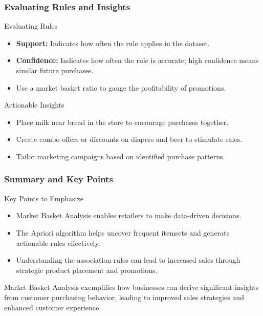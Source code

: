 \documentclass{beamer}
\begin{document}
\begin{frame}[fragile]
    \frametitle{Evaluating Rules and Insights}
    \begin{block}{Evaluating Rules}
        \begin{itemize}
            \item \textbf{Support:} Indicates how often the rule applies in the dataset.
            \item \textbf{Confidence:} Indicates how often the rule is accurate; high confidence means similar future purchases.
            \item Use a market basket ratio to gauge the profitability of promotions.
        \end{itemize}
    \end{block}
    
    \begin{block}{Actionable Insights}
        \begin{itemize}
            \item Place milk near bread in the store to encourage purchases together.
            \item Create combo offers or discounts on diapers and beer to stimulate sales.
            \item Tailor marketing campaigns based on identified purchase patterns.
        \end{itemize}
    \end{block}
\end{frame}

\begin{frame}[fragile]
    \frametitle{Summary and Key Points}
    \begin{block}{Key Points to Emphasize}
        \begin{itemize}
            \item Market Basket Analysis enables retailers to make data-driven decisions.
            \item The Apriori algorithm helps uncover frequent itemsets and generate actionable rules effectively.
            \item Understanding the association rules can lead to increased sales through strategic product placement and promotions.
        \end{itemize}
    \end{block}
    
    Market Basket Analysis exemplifies how businesses can derive significant insights from customer purchasing behavior, leading to improved sales strategies and enhanced customer experience.
\end{frame}
\end{document}

